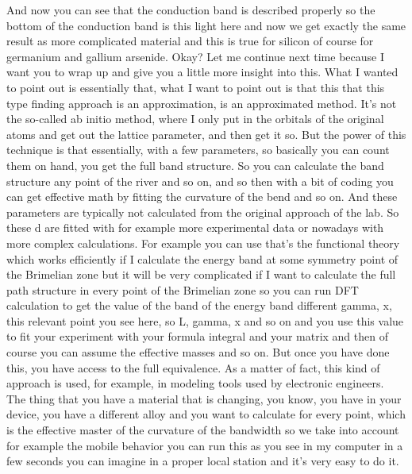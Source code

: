 And now you can see that the conduction band is described properly so the bottom of the conduction band is this light here and now we get exactly the same result as more complicated material and this is true for silicon of course for germanium and gallium arsenide. Okay? Let me continue next time because I want you to wrap up and give you a little more insight into this. What I wanted to point out is essentially that, what I want to point out is that this that this type finding approach is an approximation, is an approximated method. It's not the so-called ab initio method, where I only put in the orbitals of the original atoms and get out the lattice parameter, and then get it so. But the power of this technique is that essentially, with a few parameters, so basically you can count them on hand, you get the full band structure. So you can calculate the band structure any point of the river and so on, and so then with a bit of coding you can get effective math by fitting the curvature of the bend and so on. And these parameters are typically not calculated from the original approach of the lab. So these d are fitted with for example more experimental data or nowadays with more complex calculations. For example you can use that's the functional theory which works efficiently if I calculate the energy band at some symmetry point of the Brimelian zone but it will be very complicated if I want to calculate the full path structure in every point of the Brimelian zone so you can run DFT calculation to get the value of the band of the energy band different gamma, x, this relevant point you see here, so L, gamma, x and so on and you use this value to fit your experiment with your formula integral and your matrix and then of course you can assume the effective masses and so on. But once you have done this, you have access to the full equivalence. As a matter of fact, this kind of approach is used, for example, in modeling tools used by electronic engineers. The thing that you have a material that is changing, you know, you have in your device, you have a different alloy and you want to calculate for every point, which is the effective master of the curvature of the bandwidth so we take into account for example the mobile behavior you can run this as you see in my computer in a few seconds you can imagine in a proper local station and it's very easy to do it.\\
